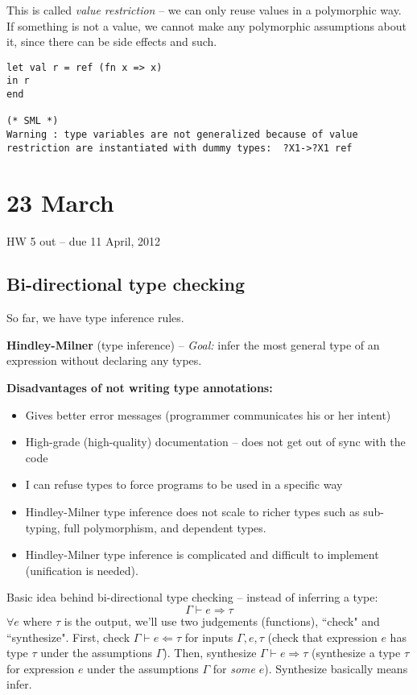 \documentclass[11pt]{article}
\begin{document}
This is called \emph{value restriction} -- we can only reuse values in a polymorphic way. If something is not a value, we cannot make any polymorphic assumptions about it, since there can be side effects and such.

\begin{verbatim}
let val r = ref (fn x => x)
in r
end

(* SML *)
Warning : type variables are not generalized because of value restriction are instantiated with dummy types:  ?X1->?X1 ref
\end{verbatim}

\section{23 March}
HW 5 out -- due 11 April, 2012

\subsection{Bi-directional type checking}
So far, we have type inference rules. 

\textbf{Hindley-Milner} (type inference) -- \emph{Goal:} infer the most general type of an expression without declaring any types.

\textbf{Disadvantages of not writing type annotations:}
\begin{itemize}
    \item Gives better error messages (programmer communicates his or her intent)
    \item High-grade (high-quality) documentation -- does not get out of sync with the code
    \item I can refuse types to force programs to be used in a specific way
    \item Hindley-Milner type inference does not scale to richer types such as sub-typing, full polymorphism, and dependent types. 
    \item Hindley-Milner type inference is complicated and difficult to implement (unification is needed).
\end{itemize}

Basic idea behind bi-directional type checking -- instead of inferring a type:
    \[
        \Gamma \vdash e \Rightarrow \tau
    \]
$\forall e$ where $\tau$ is the output, we'll use two judgements (functions), ``check" and ``synthesize". First, check $\Gamma \vdash e \Leftarrow \tau$ for inputs $\Gamma, e, \tau$ (check that expression $e$ has type $\tau$ under the assumptions $\Gamma$). Then, synthesize $\Gamma \vdash e \Rightarrow \tau$ (synthesize a type $\tau$ for expression $e$ under the assumptions $\Gamma$ for \emph{some} $e$). Synthesize basically means infer.
\end{document}
